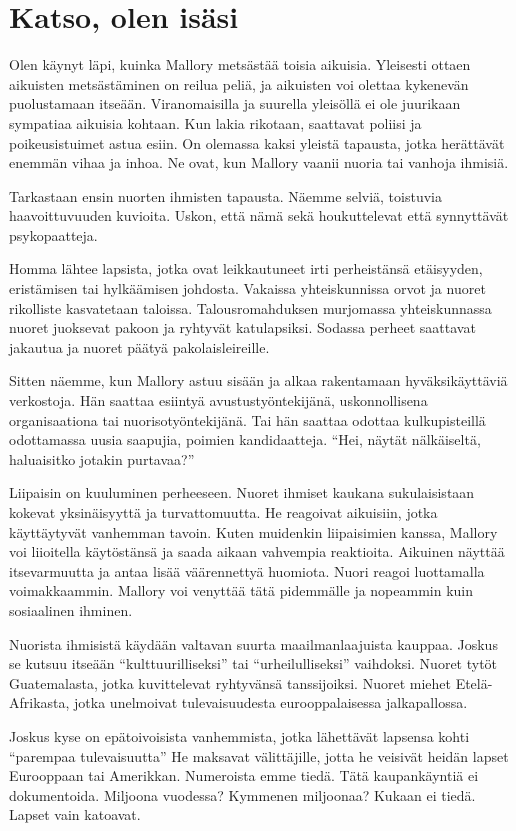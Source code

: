 \section{Katso, olen isäsi}

Olen käynyt läpi, kuinka Mallory metsästää toisia aikuisia. Yleisesti ottaen aikuisten metsästäminen on reilua peliä, ja aikuisten voi olettaa kykenevän puolustamaan itseään. Viranomaisilla ja suurella yleisöllä ei ole juurikaan sympatiaa aikuisia kohtaan. Kun lakia rikotaan, saattavat poliisi ja poikeusistuimet astua esiin. On olemassa kaksi yleistä tapausta, jotka herättävät enemmän vihaa ja inhoa. Ne ovat, kun Mallory vaanii nuoria tai vanhoja ihmisiä.

Tarkastaan ensin nuorten ihmisten tapausta. Näemme selviä, toistuvia haavoittuvuuden kuvioita. Uskon, että nämä sekä houkuttelevat että synnyttävät psykopaatteja.

Homma lähtee lapsista, jotka ovat leikkautuneet irti perheistänsä etäisyyden, eristämisen tai hylkäämisen johdosta. Vakaissa yhteiskunnissa orvot ja nuoret rikolliste kasvatetaan taloissa. Talousromahduksen murjomassa yhteiskunnassa nuoret juoksevat pakoon ja ryhtyvät katulapsiksi. Sodassa perheet saattavat jakautua ja nuoret päätyä pakolaisleireille.

Sitten näemme, kun Mallory astuu sisään ja alkaa rakentamaan hyväksikäyttäviä verkostoja. Hän saattaa esiintyä avustustyöntekijänä, uskonnollisena organisaationa tai nuorisotyöntekijänä. Tai hän saattaa odottaa kulkupisteillä odottamassa uusia saapujia, poimien kandidaatteja. ``Hei, näytät nälkäiseltä, haluaisitko jotakin purtavaa?''

Liipaisin on kuuluminen perheeseen. Nuoret ihmiset kaukana sukulaisistaan kokevat yksinäisyyttä ja turvattomuutta. He reagoivat aikuisiin, jotka käyttäytyvät vanhemman tavoin. Kuten muidenkin liipaisimien kanssa, Mallory voi liioitella käytöstänsä ja saada aikaan vahvempia reaktioita. Aikuinen näyttää itsevarmuutta ja antaa lisää väärennettyä huomiota. Nuori reagoi luottamalla voimakkaammin. Mallory voi venyttää tätä pidemmälle ja nopeammin kuin sosiaalinen ihminen.

Nuorista ihmisistä käydään valtavan suurta maailmanlaajuista kauppaa. Joskus se kutsuu itseään ``kulttuurilliseksi'' tai ``urheilulliseksi'' vaihdoksi. Nuoret tytöt Guatemalasta, jotka kuvittelevat ryhtyvänsä tanssijoiksi. Nuoret miehet Etelä-Afrikasta, jotka unelmoivat tulevaisuudesta eurooppalaisessa jalkapallossa.

Joskus kyse on epätoivoisista vanhemmista, jotka lähettävät lapsensa kohti ``parempaa tulevaisuutta'' He maksavat välittäjille, jotta he veisivät heidän lapset Eurooppaan tai Amerikkan. Numeroista emme tiedä. Tätä kaupankäyntiä ei dokumentoida. Miljoona vuodessa? Kymmenen miljoonaa? Kukaan ei tiedä. Lapset vain katoavat.

